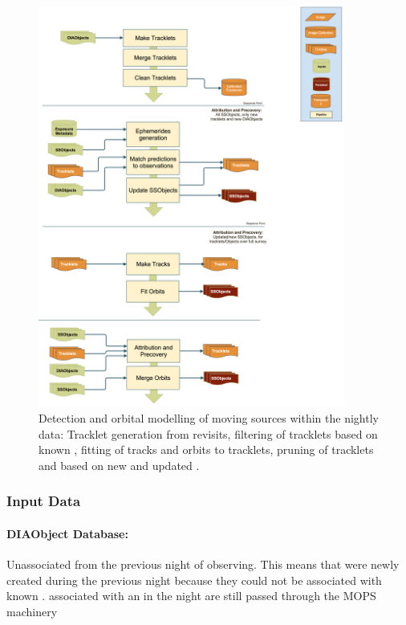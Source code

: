 \begin{figure}[th]
\begin{center}
\includegraphics[width=0.9\textwidth]{figures/MOPS.png}
\caption{\label{fig:apMOPS} Detection and orbital modelling of moving sources within the nightly data: Tracklet generation from revisits, filtering of tracklets based on  known \SSObjects, fitting of tracks and orbits to tracklets, pruning of tracklets and \DIAObjects based on new and updated \SSObjects.}
\end{center}
\end{figure}

\subsubsection{Input Data}

\paragraph*{DIAObject Database: } Unassociated \DIASources from the previous night of observing.  This means \DIAObjects that were newly created during the previous night because they could not be associated with known \DIAObjects.  \DIASources associated with an \SSObject in the night are still passed through the MOPS machinery


